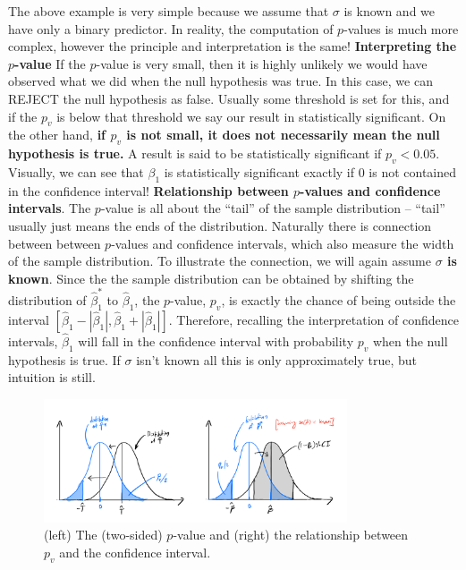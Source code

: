  The above example is very simple because we assume that $\sigma$ is known and we have only a binary predictor. In reality, the computation of $p$-values is much more complex, however the principle and interpretation is the same!
 {\bf Interpreting the $p$-value} If the $p$-value is very small, then it is highly unlikely we would have observed what we did when the null hypothesis was true. In this case, we can REJECT the null hypothesis as false. Usually some threshold is set for this, and if the $p_v$ is below that threshold we say our result in statistically significant. On the other hand, {\bf if $p_v$ is not small, it does not necessarily mean the null hypothesis is true.} A result is said to be statistically significant if $p_v<0.05$. Visually, we can see that $\beta_1$ is statistically significant exactly if $0$ is not contained in the confidence interval! 
{\bf Relationship between $p$-values and confidence intervals}.  The $p$-value is all about the ``tail'' of the sample distribution -- ``tail'' usually just means the ends of the distribution. Naturally there is connection between between $p$-values and confidence intervals, which also measure the width of the sample distribution. To illustrate the connection, we will again assume {\bf $\sigma$ is known}.  Since the  the sample distribution can be obtained by shifting the distribution of $\hat{\beta}_1^*$ to $\hat{\beta}_1$, the $p$-value, $p_v$, is exactly the chance of being outside the interval $[\hat{\beta}_1 - |\hat{\beta}_1|,\hat{\beta}_1 + |\hat{\beta}_1|]$. Therefore,  recalling the interpretation of confidence intervals, $\hat{\beta}_1$ will fall in the confidence interval with probability $p_v$ when the null hypothesis is true.  If $\sigma$ isn't known all this is only approximately true, but intuition is still. 



\begin{figure}[h]
\centering
\includegraphics[width=0.8\textwidth]{./../figures/pvalueCI}
\caption{(left) The (two-sided) $p$-value and (right) the relationship between $p_v$ and the confidence interval. }\label{fig:pvalue}
\end{figure}





